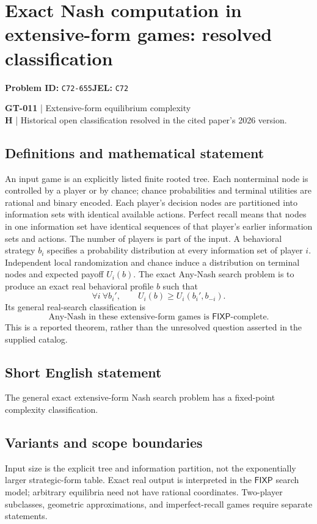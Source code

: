 \documentclass[11pt,a4paper]{article}
\begin{document}
\section*{Exact Nash computation in extensive-form games: resolved classification}
\textbf{Problem ID:} \texttt{C72-655}\quad \textbf{JEL:} \texttt{C72}\par
\label{problem:OP-0141}
\label{game:GT-011}
{\sffamily\small\color{muted}
\textbf{GT-011} | Extensive-form equilibrium complexity\\
\textbf{H} | Historical open classification resolved in the cited paper's 2026 version.
\par}
\subsection*{Definitions and mathematical statement}
An input game is an explicitly listed finite rooted tree. Each nonterminal node is controlled by a player or by chance; chance probabilities and terminal utilities are rational and binary encoded. Each player's decision nodes are partitioned into information sets with identical available actions. Perfect recall means that nodes in one information set have identical sequences of that player's earlier information sets and actions. The number of players is part of the input.
A behavioral strategy $b_i$ specifies a probability distribution at every information set of player $i$. Independent local randomization and chance induce a distribution on terminal nodes and expected payoff $U_i(b)$. The exact Any-Nash search problem is to produce an exact real behavioral profile $b$ such that
\[
 \forall i\ \forall b_i',\qquad U_i(b)\geq U_i(b_i',b_{-i}).
\]
Its general real-search classification is
\[
 \text{Any-Nash in these extensive-form games is }\mathsf{FIXP}\text{-complete}.
\]
This is a reported theorem, rather than the unresolved question asserted in the supplied catalog.
\subsection*{Short English statement}
The general exact extensive-form Nash search problem has a fixed-point complexity classification.
\subsection*{Variants and scope boundaries}
Input size is the explicit tree and information partition, not the exponentially larger strategic-form table. Exact real output is interpreted in the $\mathsf{FIXP}$ search model; arbitrary equilibria need not have rational coordinates. Two-player subclasses, geometric approximations, and imperfect-recall games require separate statements.
\end{document}
